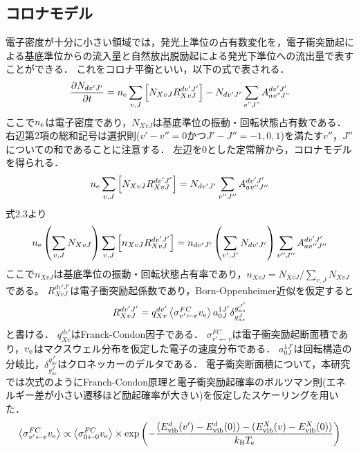 \subsection{コロナモデル}
電子密度が十分に小さい領域では，発光上準位の占有数変化を，電子衝突励起による基底準位からの流入量と自然放出脱励起による発光下準位への流出量で表すことができる．
これをコロナ平衡といい，以下の式で表される\cite{PRnoijousei}．
\begin{equation}
    \frac{\partial N_{dv'J'}}{\partial t} = n_{\rm e} \sum_{v, J} \left[ N_{XvJ} R^{dv'J'}_{XvJ} \right] - N_{dv'J'} \sum_{v"J"} A^{dv'J'}_{av"J"}
\end{equation}
ここで$n_{\rm e}$は電子密度であり，$N_{XvJ}$は基底準位の振動・回転状態占有数である．
右辺第2項の総和記号は選択則($v'-v''=0$かつ$J'-J''=-1,0,1$)を満たす$v''，J''$についての和であることに注意する．
左辺を0とした定常解から，コロナモデルを得られる．
\begin{equation}
    n_{\rm e} \sum_{v, J} \left[ N_{XvJ} R^{dv'J'}_{XvJ} \right] = N_{dv'J'} \sum_{v''J''} A^{dv'J'}_{av''J''}
\end{equation}
式2.3より
\begin{equation}
    n_{\rm e} \left( \sum_{v, J} N_{XvJ} \right) \sum_{v, J} \left[ n_{XvJ} R^{dv'J'}_{XvJ} \right] = n_{dv'J'} \left( \sum_{v', J'} N_{dv'J'} \right) \sum_{v''J''} A^{dv'J'}_{av''J''}
\end{equation}
ここで$n_{XvJ}$は基底準位の振動・回転状態占有率であり，$n_{XvJ} = N_{XvJ} / \sum_{v,J} N_{XvJ}$である。
$R^{dv'J'}_{XvJ}$は電子衝突励起係数であり，Born-Oppenheimer近似を仮定すると
\begin{equation}
    R^{dv'J'}_{XvJ} = q^{dv'}_{Xv} \left< \sigma^{FC}_{v' \leftarrow v} v_{\rm e} \right> a^{1J'}_{0J} \delta^{g^{J'}_{as}}_{g^J_{as}}
\end{equation}
と書ける\cite{PRnoijousei}．
$q^{dv'}_{Xv}$はFranck-Condon因子である．
$\sigma^{FC}_{v' \leftarrow v}$は電子衝突励起断面積であり，$v_{\rm e}$はマクスウェル分布を仮定した電子の速度分布である．
$a^{1J'}_{0J}$は回転構造の分岐比，$\delta^{g^{J'}_{as}}_{g^J_{as}}$はクロネッカーのデルタである．
電子衝突断面積について，本研究では次式のようにFranch-Condon原理と電子衝突励起確率のボルツマン則(エネルギー差が小さい遷移ほど励起確率が大きい)を仮定したスケーリングを用いた\cite{kyokaisou}．
\begin{equation}
    \left< \sigma^{FC}_{v' \leftarrow v} v_{\rm e} \right> \propto \left< \sigma^{FC}_{0 \leftarrow 0} v_{\rm e} \right> \times \exp \left( -\frac{(E^d_{\rm vib} (v') - E^d_{\rm vib} (0))-(E^X_{\rm vib} (v) - E^X_{\rm vib} (0))}{k_{\rm B} T_{\rm e}} \right)
\end{equation}

